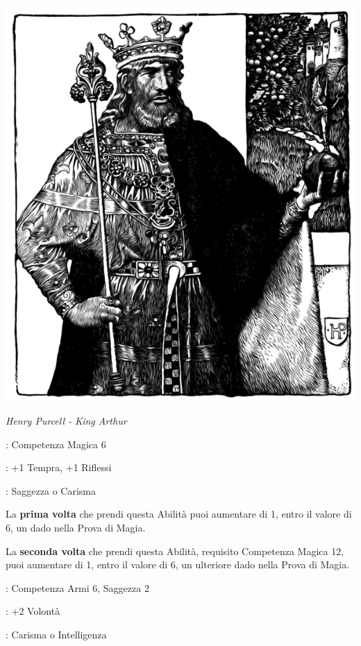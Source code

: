 \begin{multicols}{2}
\begin{center}
	\includegraphics[width=0.8\linewidth]{immagini/oggettimagiciuomo.png}

	\emph{Henry Purcell - King Arthur}
\end{center}

\begin{description}[noitemsep, topsep=0pt, parsep=0pt, partopsep=0pt, leftmargin=0cm, labelwidth=2.5cm]
    \item[\textbf{Requisito}]: Competenza Magica 6
    \item[\textbf{Tiri Salvezza}]: +1 Tempra, +1 Riflessi
    \item[\textbf{Caratteristica}]: Saggezza o Carisma
\end{description}

La \textbf{prima volta} che prendi questa Abilità puoi aumentare di 1, entro il valore di 6, un dado nella Prova di Magia.

La \textbf{seconda volta} che prendi questa Abilità, requisito Competenza Magica 12, puoi aumentare di 1, entro il valore di 6, un ulteriore dado nella Prova di Magia.

\begin{description}[noitemsep, topsep=0pt, parsep=0pt, partopsep=0pt, leftmargin=0cm, labelwidth=2.5cm]
    \item[\textbf{Requisito}]: Competenza Armi 6, Saggezza 2
    \item[\textbf{Tiri Salvezza}]: +2 Volontà
    \item[\textbf{Caratteristica}]: Carisma o Intelligenza
\end{description}


\end{multicols}
